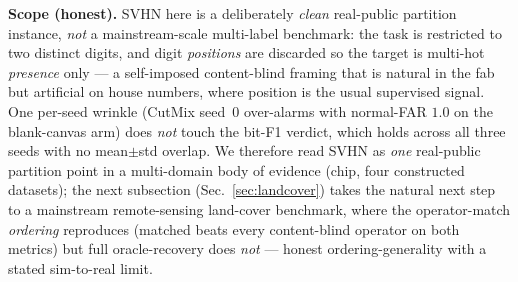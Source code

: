 \documentclass[11pt]{article}
\begin{document}
\textbf{Scope (honest).} SVHN here is a deliberately \emph{clean} real-public partition
instance, \emph{not} a mainstream-scale multi-label benchmark: the task is restricted to two
distinct digits, and digit \emph{positions} are discarded so the target is multi-hot
\emph{presence} only --- a self-imposed content-blind framing that is natural in the fab but
artificial on house numbers, where position is the usual supervised signal. One per-seed
wrinkle (CutMix seed~0 over-alarms with normal-FAR $1.0$ on the blank-canvas arm) does
\emph{not} touch the bit-F1 verdict, which holds across all three seeds with no
mean$\pm$std overlap. We therefore read SVHN as \emph{one} real-public partition point in a
multi-domain body of evidence (chip, four constructed datasets); the next subsection
(Sec.~\ref{sec:landcover}) takes the natural next step to a mainstream remote-sensing
land-cover benchmark, where the operator-match \emph{ordering} reproduces (matched beats
every content-blind operator on both metrics) but full oracle-recovery does \emph{not} ---
honest ordering-generality with a stated sim-to-real limit.
\end{document}
